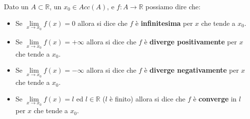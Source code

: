 \begin{definition}
Dato un $A \subset \mathbb{R}$, un $x_0 \in Acc(A)$, e $f: A \to \mathbb{R}$ possiamo dire che:
\begin{itemize}
    \item Se $\lim\limits_{x\to x_0}f(x) = 0$ allora si dice che $f$ è \textbf{infinitesima} per $x$ che tende a $x_0$.
    \item Se $\lim\limits_{x\to x_0}f(x) = +\infty$ allora si dice che $f$ è \textbf{diverge positivamente} per $x$ che tende a $x_0$.
    \item Se $\lim\limits_{x\to x_0}f(x) = -\infty$ allora si dice che $f$ è \textbf{diverge negativamente} per $x$ che tende a $x_0$.
    \item Se $\lim\limits_{x\to x_0}f(x) = l$ ed $l \in \mathbb{R}$ ($l$ è finito) allora si dice che $f$ è \textbf{converge} in $l$ per $x$ che tende a $x_0$.
\end{itemize}
\end{definition}


